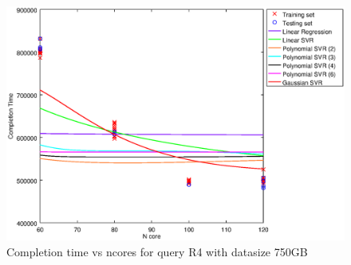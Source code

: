 
\begin {figure}[hbtp]
\centering
\includegraphics[width=\textwidth]{output/R4_750_1_OVER_NCORES/plot_R4_750.eps}
\caption{Completion time vs ncores for query R4 with datasize 750GB}
\label{fig:all_nonlinear_R4_750}
\end {figure}
